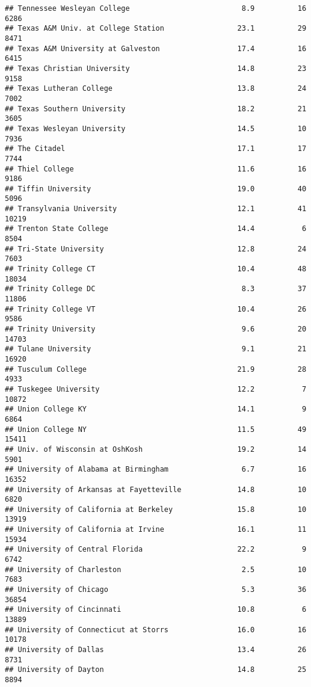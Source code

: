 \documentclass[
]{article}
\begin{document}
\begin{verbatim}
## Tennessee Wesleyan College                          8.9          16   6286
## Texas A&M Univ. at College Station                 23.1          29   8471
## Texas A&M University at Galveston                  17.4          16   6415
## Texas Christian University                         14.8          23   9158
## Texas Lutheran College                             13.8          24   7002
## Texas Southern University                          18.2          21   3605
## Texas Wesleyan University                          14.5          10   7936
## The Citadel                                        17.1          17   7744
## Thiel College                                      11.6          16   9186
## Tiffin University                                  19.0          40   5096
## Transylvania University                            12.1          41  10219
## Trenton State College                              14.4           6   8504
## Tri-State University                               12.8          24   7603
## Trinity College CT                                 10.4          48  18034
## Trinity College DC                                  8.3          37  11806
## Trinity College VT                                 10.4          26   9586
## Trinity University                                  9.6          20  14703
## Tulane University                                   9.1          21  16920
## Tusculum College                                   21.9          28   4933
## Tuskegee University                                12.2           7  10872
## Union College KY                                   14.1           9   6864
## Union College NY                                   11.5          49  15411
## Univ. of Wisconsin at OshKosh                      19.2          14   5901
## University of Alabama at Birmingham                 6.7          16  16352
## University of Arkansas at Fayetteville             14.8          10   6820
## University of California at Berkeley               15.8          10  13919
## University of California at Irvine                 16.1          11  15934
## University of Central Florida                      22.2           9   6742
## University of Charleston                            2.5          10   7683
## University of Chicago                               5.3          36  36854
## University of Cincinnati                           10.8           6  13889
## University of Connecticut at Storrs                16.0          16  10178
## University of Dallas                               13.4          26   8731
## University of Dayton                               14.8          25   8894

\end{verbatim}
\end{document}
